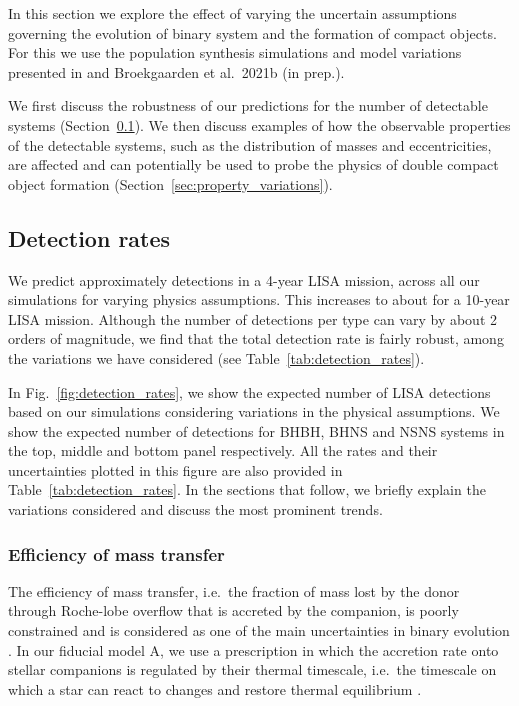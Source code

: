 In this section we explore the effect of varying the uncertain assumptions governing the evolution of binary system and the formation of compact objects. For this we use the population synthesis simulations and model variations presented in \citet{Broekgaarden+2021} and Broekgaarden et al.\ 2021b (in prep.).

We first discuss the robustness of our predictions for the number of detectable systems (Section~\ref{sec:detection_rate_analysis}). We then discuss examples of how the observable properties of the detectable systems, such as the distribution of masses and eccentricities, are affected and can potentially be used to probe the physics of double compact object formation (Section~\ref{sec:property_variations}).

\subsection{Detection rates}\label{sec:detection_rate_analysis}
We predict approximately \rangeFourYear{} detections in a 4-year LISA mission, across all our simulations for varying physics assumptions. This increases to about \rangeTenYear{} for a 10-year LISA mission. Although the number of detections per type can vary by about 2 orders of magnitude, we find that the total detection rate is fairly robust, among the variations we have considered (see Table~\ref{tab:detection_rates}).

In Fig.~\ref{fig:detection_rates}, we show the expected number of LISA detections based on our simulations considering variations in the physical assumptions. We show the expected number of detections for BHBH, BHNS and NSNS systems in the top, middle and bottom panel respectively. All the rates and their uncertainties plotted in this figure are also provided in Table~\ref{tab:detection_rates}. 
In the sections that follow, we briefly explain the variations considered and discuss the most prominent trends. 

\subsubsection{Efficiency of mass transfer}

The efficiency of mass transfer, i.e.\ the fraction of mass lost by the donor through Roche-lobe overflow that is accreted by the companion, is poorly constrained and is considered as one of the main uncertainties in binary evolution \citep[e.g.][]{deMink+2007}. In our fiducial model A, we use a prescription in which the accretion rate onto stellar companions is regulated by their thermal timescale, i.e.\ the timescale on which a star can react to changes and restore thermal equilibrium \citep[see e.g.][]{Schneider+2015}. 

